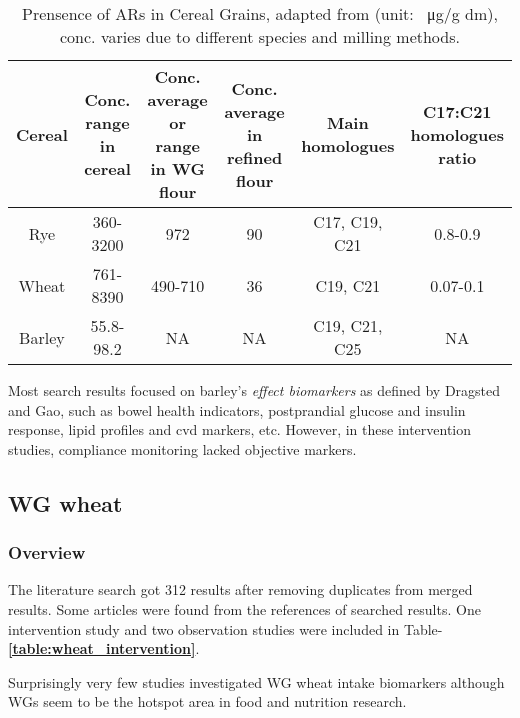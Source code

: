\begin{table}[h!]
		\footnotesize
\centering
\begin{tabular}{|c|c|c|c|c|c|}
	\hline 
	Cereal & \makecell{Conc. range \\in cereal}& \makecell{Conc. average \\or range \\in WG flour }& \makecell{Conc. average \\in refined \\flour} & \makecell{Main\\homologues} & \makecell{C17:C21\\ homologues\\ratio} \\ 
	\hline 
	Rye&360-3200& 972 &90&C17, C19, C21& 0.8-0.9 \\ 
	\hline 
	Wheat&761-8390& 490-710 & 36& C19, C21& 0.07-0.1 \\ 
	\hline 
	Barley& 55.8-98.2&NA & NA& C19, C21, C25&NA  \\ 
	\hline 
\end{tabular} 
	\caption{Prensence of ARs in Cereal Grains, adapted from \cite{doi:10.1021/jf0340456,ANDERSSON2010794,BORDIGA201638}(unit: \SI{}{\micro\gram}/g dm), conc. varies due to different species and milling methods.}
	\label{table:ars_in_plant}
\end{table}

Most search results focused on barley's \textit{effect biomarkers} as defined by Dragsted\cite{Dragsted2017} and Gao\cite{Gao2017}, such as bowel health indicators\cite{Bird2008}, postprandial glucose and insulin response\cite{Ames2015}, lipid profiles and \acrfull{cvd} markers\cite{Marungruang2018}, etc. However, in these intervention studies, compliance monitoring lacked objective markers.


\subsection{WG wheat}
\subsubsection{Overview}
The literature search got 312 results after removing duplicates from merged results. Some articles were found from the references of searched results. One intervention study and two observation studies were included in Table-\textbf{\ref{table:wheat_intervention}}. 

Surprisingly very few studies investigated WG wheat intake biomarkers although WGs seem to be the hotspot area in food and nutrition research. 



